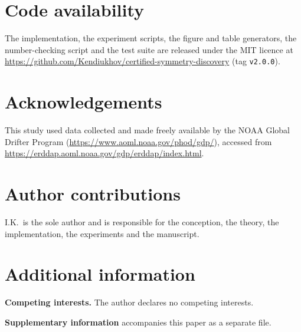 \documentclass[pdflatex,sn-nature,lineno]{sn-jnl}
\theoremstyle{plain}
\theoremstyle{definition}
\begin{document}
\section*{Code availability}

The implementation, the experiment scripts, the figure and table generators,
the number-checking script and the test suite are released under the MIT
licence at \url{https://github.com/Kendiukhov/certified-symmetry-discovery}
(tag \texttt{v2.0.0}).



\section*{Acknowledgements}

This study used data collected and made freely available by the NOAA Global
Drifter Program (\url{https://www.aoml.noaa.gov/phod/gdp/}), accessed from
\url{https://erddap.aoml.noaa.gov/gdp/erddap/index.html}.

\section*{Author contributions}

I.K.\ is the sole author and is responsible for the conception, the theory, the
implementation, the experiments and the manuscript.

\section*{Additional information}

\textbf{Competing interests.} The author declares no competing interests.

\noindent\textbf{Supplementary information} accompanies this paper as a
separate file.
\end{document}
